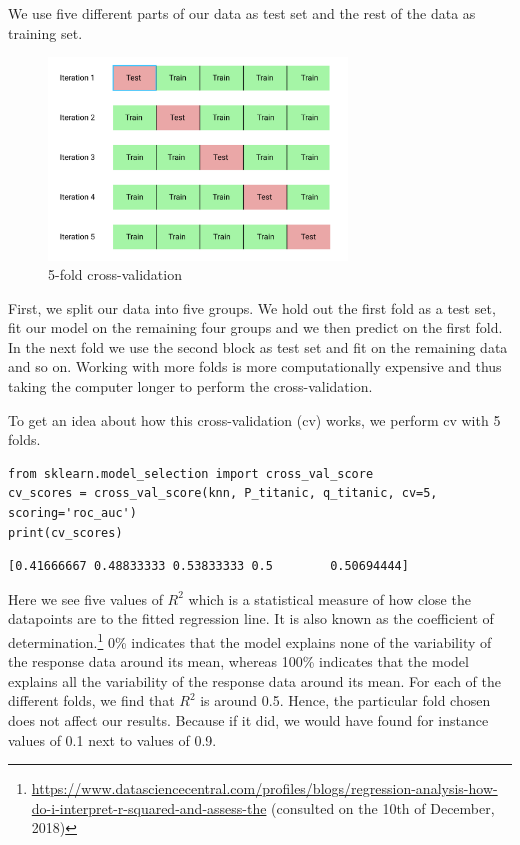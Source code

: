\documentclass[11pt]{article}
\begin{document}
We use five different parts of our data as test set and the rest of the data as training set.


\begin{figure}[htbp]
\centering
\includegraphics[width=300px]{./CrossValidation.png}
\caption{\label{tab:5-foldcross}
5-fold cross-validation}
\end{figure}


First, we split our data into five groups. We hold out the first fold as a test set, fit our model on the remaining four groups and we then predict on the first fold. In the next fold we use the second block as test set and fit on the remaining data and so on. Working with more folds is more computationally expensive and thus taking the computer longer to perform the cross-validation. 

To get an idea about how this cross-validation (cv) works, we perform cv with 5 folds. 

\begin{verbatim}
from sklearn.model_selection import cross_val_score
cv_scores = cross_val_score(knn, P_titanic, q_titanic, cv=5, scoring='roc_auc')
print(cv_scores)
\end{verbatim}

\begin{verbatim}
[0.41666667 0.48833333 0.53833333 0.5        0.50694444]

\end{verbatim}

Here we see five values of \(R^{2}\) which is a statistical measure of how close the datapoints are to the fitted regression line. It is also known as the coefficient of determination.\footnote{\url{https://www.datasciencecentral.com/profiles/blogs/regression-analysis-how-do-i-interpret-r-squared-and-assess-the} (consulted on the 10th of December, 2018)} 0\% indicates that the model explains none of the variability of the response data around its mean, whereas 100\% indicates that the model explains all the variability of the response data around its mean. For each of the different folds, we find that \(R^2\) is around 0.5. Hence, the particular fold chosen does not affect our results. Because if it did, we would have found for instance values of 0.1 next to values of 0.9. 
\end{document}
